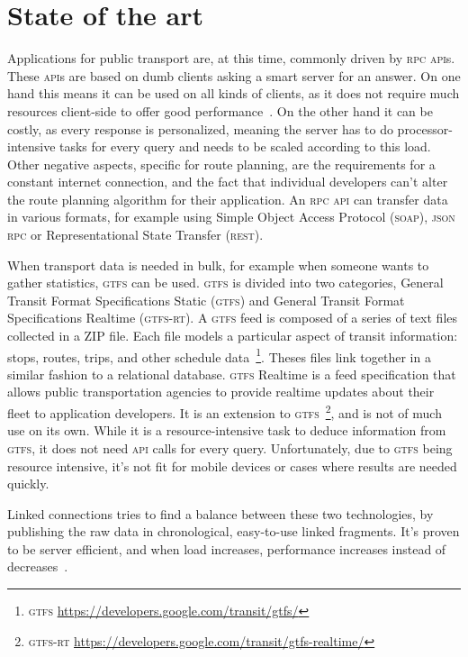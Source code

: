 \documentclass[twocolumn]{phdsymp} %
\begin{document}
\section{State of the art}
Applications for public transport are, at this time, commonly driven by \textsc{rpc} \textsc{api}s. These \textsc{api}s are based on dumb clients asking a smart server for an answer. On one hand this means it can be used on all kinds of clients, as it does not require much resources client-side to offer good performance~\cite{rpc}. On the other hand it can be costly, as every response is personalized, meaning the server has to do processor-intensive tasks for every query and needs to be scaled according to this load. Other negative aspects, specific for route planning, are the requirements for a constant internet connection, and the fact that individual developers can’t alter the route planning algorithm for their application. An \textsc{rpc} \textsc{api} can transfer data in various formats, for example using Simple Object Access Protocol (\textsc{soap}), \textsc{json} \textsc{rpc} or Representational State Transfer (\textsc{rest}). 

When transport data is needed in bulk, for example when someone wants to gather statistics, \textsc{gtfs}  can be used. \textsc{gtfs}  is divided into two categories, General Transit Format Specifications Static (\textsc{gtfs}) and General Transit Format Specifications Realtime (\textsc{gtfs-rt}). A \textsc{gtfs}  feed is composed of a series of text files collected in a ZIP file. Each file models a particular aspect of transit information: stops, routes, trips, and other schedule data~\footnote{\textsc{gtfs} \url{https://developers.google.com/transit/gtfs/}}. Theses files link together in a similar fashion to a relational database. \textsc{gtfs}  Realtime is a feed specification that allows public transportation agencies to provide realtime updates about their fleet to application developers. It is an extension to \textsc{gtfs}~\footnote{\textsc{gtfs-rt} \url{https://developers.google.com/transit/gtfs-realtime/}}, and is not of much use on its own.
While it is a resource-intensive task to deduce information from \textsc{gtfs}, it does not need \textsc{api} calls for every query. Unfortunately, due to \textsc{gtfs} being resource intensive, it’s not fit for mobile devices or cases where results are needed quickly.

Linked connections tries to find a balance between these two technologies, by publishing the raw data in chronological, easy-to-use linked fragments. It’s proven to be server efficient, and when load increases, performance increases instead of decreases~\cite{colpaert17}.
\end{document}
